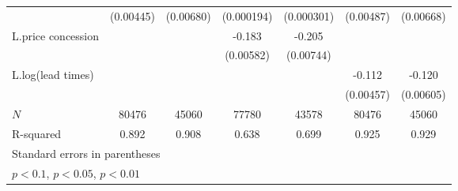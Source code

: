 {\begin{tabular}{l*{6}{c}}
            &   (0.00445)         &   (0.00680)         &  (0.000194)         &  (0.000301)         &   (0.00487)         &   (0.00668)         \\
\addlinespace
L.price concession&                     &                     &      -0.183\sym{***}&      -0.205\sym{***}&                     &                     \\
            &                     &                     &   (0.00582)         &   (0.00744)         &                     &                     \\
\addlinespace
L.log(lead times)   &                     &                     &                     &                     &      -0.112\sym{***}&      -0.120\sym{***}\\
            &                     &                     &                     &                     &   (0.00457)         &   (0.00605)         \\
\midrule
\(N\)       &       80476         &       45060         &       77780         &       43578         &       80476         &       45060         \\
R-squared   &       0.892         &       0.908         &       0.638         &       0.699         &       0.925         &       0.929         \\
\bottomrule
\multicolumn{7}{l}{\footnotesize Standard errors in parentheses}\\
\multicolumn{7}{l}{\footnotesize \sym{*} \(p<0.1\), \sym{**} \(p<0.05\), \sym{***} \(p<0.01\)}\\
\end{tabular}
}
